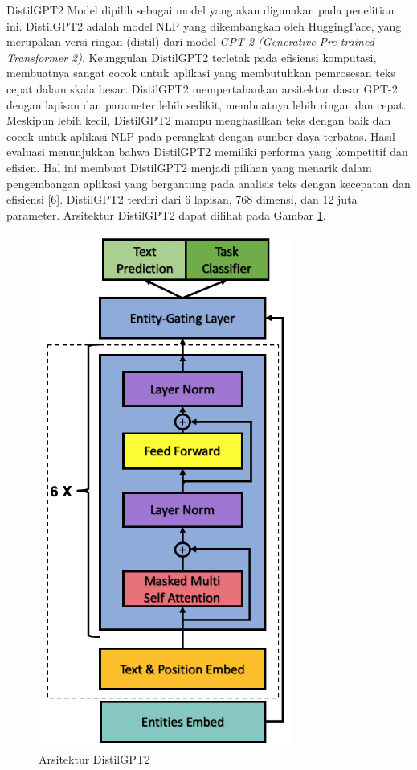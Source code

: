 DistilGPT2 Model dipilih sebagai model yang akan digunakan pada 
penelitian ini. DistilGPT2 adalah model NLP yang dikembangkan oleh 
HuggingFace, yang merupakan versi ringan (distil) dari model 
\emph{GPT-2 (Generative Pre-trained Transformer 2)}. Keunggulan 
DistilGPT2 terletak pada efisiensi komputasi, membuatnya sangat 
cocok untuk aplikasi yang membutuhkan pemrosesan teks cepat dalam 
skala besar. DistilGPT2 mempertahankan arsitektur dasar GPT-2 dengan 
lapisan dan parameter lebih sedikit, membuatnya lebih ringan dan cepat. 
Meskipun lebih kecil, DistilGPT2 mampu menghasilkan teks dengan baik 
dan cocok untuk aplikasi NLP pada perangkat dengan sumber daya 
terbatas. Hasil evaluasi menunjukkan bahwa DistilGPT2 memiliki 
performa yang kompetitif dan efisien. Hal ini membuat DistilGPT2 
menjadi pilihan yang menarik dalam pengembangan aplikasi yang 
bergantung pada analisis teks dengan kecepatan dan efisiensi [6]. 
DistilGPT2 terdiri dari 6 lapisan, 768 dimensi, dan 12 juta parameter.
Arsitektur DistilGPT2 dapat dilihat pada Gambar 
\ref{fig:distilgpt2Architecture}.

\begin{figure}[H]
  \centering
  \includegraphics[scale=0.5]{gambar/DistilledGPT2Architecture.png}
  \caption{Arsitektur DistilGPT2}
  \label{fig:distilgpt2Architecture}
\end{figure}

